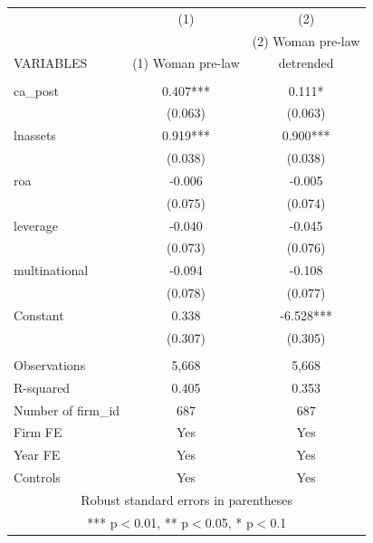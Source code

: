 \begin{tabular}{lcc} \hline
 & (1) & (2) \\
 &  & (2) Woman pre-law \\
VARIABLES & (1) Woman pre-law & detrended \\ \hline
 &  &  \\
ca\_post & 0.407*** & 0.111* \\
 & (0.063) & (0.063) \\
lnassets & 0.919*** & 0.900*** \\
 & (0.038) & (0.038) \\
roa & -0.006 & -0.005 \\
 & (0.075) & (0.074) \\
leverage & -0.040 & -0.045 \\
 & (0.073) & (0.076) \\
multinational & -0.094 & -0.108 \\
 & (0.078) & (0.077) \\
Constant & 0.338 & -6.528*** \\
 & (0.307) & (0.305) \\
 &  &  \\
Observations & 5,668 & 5,668 \\
R-squared & 0.405 & 0.353 \\
Number of firm\_id & 687 & 687 \\
Firm FE & Yes & Yes \\
Year FE & Yes & Yes \\
 Controls & Yes & Yes \\ \hline
\multicolumn{3}{c}{ Robust standard errors in parentheses} \\
\multicolumn{3}{c}{ *** p$<$0.01, ** p$<$0.05, * p$<$0.1} \\
\end{tabular}
